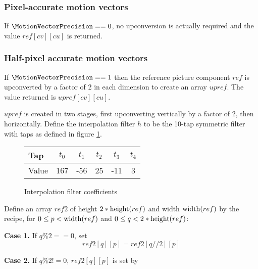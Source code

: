 \subsubsection{Pixel-accurate motion vectors}

If $\MotionVectorPrecision==0$, no upconversion is actually required and the value
$ref[cv][cu]$ is returned.

\subsubsection{Half-pixel accurate motion vectors}
\label{halfpel}

If $\MotionVectorPrecision==1$ then the reference picture component $ref$ is
upconverted by a factor of 2 in each dimension to create an
array $upref$. The value returned is $upref[cv][cu]$.

$upref$ is created in two stages, first upconverting vertically by
a factor of 2, then horizontally. Define the interpolation filter $h$
to be the 10-tap symmetric filter with taps as defined in figure \ref{upfilter}.

\begin{figure}[h!]
\begin{centering}
\begin{tabular}{l|ccccc}
Tap & $t_0$ & $t_1$ & $t_2$ & $t_3$ & $t_4$\\
\hline
Value & 167 & -56 & 25 & -11 & 3
\end{tabular}
\caption{Interpolation filter coefficients \label{upfilter}}
\end{centering}
\end{figure}

Define an array $ref2$ of height $2*\operatorname{height}(ref)$ and width $\operatorname{width}(ref)$ by
the recipe, for $0\leq p<\operatorname{width}(ref)$ and $0\leq q<2*\operatorname{height}(ref)$:

{\bf Case 1.} If $q\%2==0$, set
\begin{equation*}
ref2[q][p]=ref2[q//2][p]
\end{equation*}

{\bf Case 2.} If $q\%2!=0$, $ref2[q][p]$ is set by

\begin{pseudo*}
\end{pseudo*}

